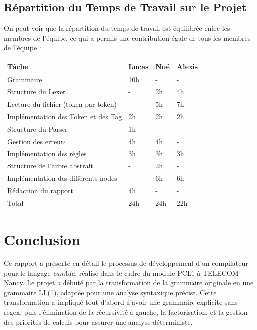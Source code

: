 \documentclass[french,a4paper]{article}
\begin{document}
    \subsection{Répartition du Temps de Travail sur le Projet}\label{subsec:repartition-du-temps-de-travail-sur-le-projet}

    On peut voir que la répartition du temps de travail est équilibrée entre les membres de l'équipe, ce qui a permis une contribution égale de tous les membres de l'équipe :
    \newline

    \begin{tabular}{@{}llll@{}}
        \toprule
        Tâche & Lucas & Noé & Alexis \\ \midrule
        Grammaire & 10h & - & - \\
        Structure du Lexer & - & 2h & 4h \\
        Lecture du fichier (token par token) & - & 5h & 7h \\
        Implémentation des Token et des Tag & 2h & 2h & 2h \\
        Structure du Parser & 1h & - & - \\
        Gestion des erreurs & 4h & 4h & - \\
        Implémentation des règles & 3h & 3h & 3h \\
        Structure de l'arbre abstrait & - & 2h & - \\
        Implémentation des différents nodes & - & 6h & 6h \\
        Rédaction du rapport & 4h & - & - \\
        \midrule
        Total & 24h & 24h & 22h \\ \bottomrule
    \end{tabular}

    \section{Conclusion}\label{sec:conclusion}
    Ce rapport a présenté en détail le processus de développement d'un compilateur pour le langage \textit{canAda}, réalisé dans le cadre du module PCL1 à TELECOM Nancy.
    Le projet a débuté par la transformation de la grammaire originale en une grammaire LL(1), adaptée pour une analyse syntaxique précise.
    Cette transformation a impliqué tout d'abord d'avoir une grammaire explicite sans regex, puis l'élimination de la récursivité à gauche, la factorisation, et la gestion des priorités de calculs pour assurer une analyse déterministe.
\end{document}
